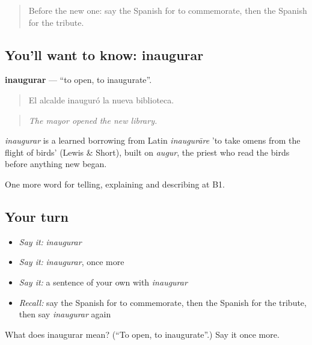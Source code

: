 \label{lesson:ES-C558-inaugurar}



\begin{quote}
Before the new one: say the Spanish for to commemorate, then the Spanish for the tribute.
\end{quote}

\subsection*{You'll want to know: inaugurar}
\textbf{inaugurar} — \textquotedblleft{}to open, to inaugurate\textquotedblright{}.

\begin{quote}
El alcalde inauguró la nueva biblioteca.
\end{quote}

\begin{quote}
\emph{The mayor opened the new library.}
\end{quote}

\begin{cousinweb}
\emph{inaugurar} is a learned borrowing from Latin \emph{inaugurāre} 'to take omens from the flight of birds' (Lewis \& Short), built on \emph{augur}, the priest who read the birds before anything new began.
\end{cousinweb}

\begin{grammarlens}[title={What you've built}]
One more word for telling, explaining and describing at B1.
\end{grammarlens}

\subsection*{Your turn}
\begin{itemize}
\raggedright
  \item \emph{Say it:} \emph{inaugurar}
  \item \emph{Say it:} \emph{inaugurar}, once more
  \item \emph{Say it:} a sentence of your own with \emph{inaugurar}
  \item \emph{Recall:} say the Spanish for to commemorate, then the Spanish for the tribute, then say \emph{inaugurar} again
\end{itemize}

\begin{tcolorbox}[breakable,colback=teal!4,colframe=teal!35!black,title={Before you move on}]
What does inaugurar mean? (\textquotedblleft{}To open, to inaugurate\textquotedblright{}.) Say it once more.
\end{tcolorbox}
